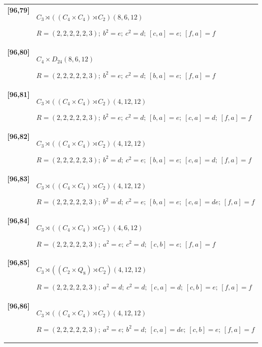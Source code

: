 \documentclass[UTF8,fontset=fandol,11pt,a4paper]{ctexart}
\begin{document}
\begin{longtable}{@{}p{17mm}>{\raggedright\arraybackslash}p{141mm}@{}}
\textbf{[96,79]} & $C_{3}\rtimes ((C_{4}\times C_{4})\rtimes C_{2})$\quad $(8,6,12)$\par\(R=(2,2,2,2,2,3);\allowbreak\ b^{2}=e;\allowbreak\ c^{2}=d;\allowbreak\ [c,a]=e;\allowbreak\ [f,a]=f\)\\[3pt]

\textbf{[96,80]} & $C_{4}\times D_{24}$\quad $(8,6,12)$\par\(R=(2,2,2,2,2,3);\allowbreak\ b^{2}=e;\allowbreak\ c^{2}=d;\allowbreak\ [b,a]=e;\allowbreak\ [f,a]=f\)\\[3pt]

\textbf{[96,81]} & $C_{3}\rtimes ((C_{4}\times C_{4})\rtimes C_{2})$\quad $(4,12,12)$\par\(R=(2,2,2,2,2,3);\allowbreak\ b^{2}=e;\allowbreak\ c^{2}=d;\allowbreak\ [b,a]=e;\allowbreak\ [c,a]=d;\allowbreak\ [f,a]=f\)\\[3pt]

\textbf{[96,82]} & $C_{3}\rtimes ((C_{4}\times C_{4})\rtimes C_{2})$\quad $(4,12,12)$\par\(R=(2,2,2,2,2,3);\allowbreak\ b^{2}=d;\allowbreak\ c^{2}=e;\allowbreak\ [b,a]=e;\allowbreak\ [c,a]=d;\allowbreak\ [f,a]=f\)\\[3pt]

\textbf{[96,83]} & $C_{3}\rtimes ((C_{4}\times C_{4})\rtimes C_{2})$\quad $(4,12,12)$\par\(R=(2,2,2,2,2,3);\allowbreak\ b^{2}=d;\allowbreak\ c^{2}=e;\allowbreak\ [b,a]=e;\allowbreak\ [c,a]=de;\allowbreak\ [f,a]=f\)\\[3pt]

\textbf{[96,84]} & $C_{3}\rtimes ((C_{4}\times C_{4})\rtimes C_{2})$\quad $(4,6,12)$\par\(R=(2,2,2,2,2,3);\allowbreak\ a^{2}=e;\allowbreak\ c^{2}=d;\allowbreak\ [c,b]=e;\allowbreak\ [f,a]=f\)\\[3pt]

\textbf{[96,85]} & $C_{3}\rtimes ((C_{2}\times Q_{8})\rtimes C_{2})$\quad $(4,12,12)$\par\(R=(2,2,2,2,2,3);\allowbreak\ a^{2}=d;\allowbreak\ c^{2}=d;\allowbreak\ [c,a]=d;\allowbreak\ [c,b]=e;\allowbreak\ [f,a]=f\)\\[3pt]

\textbf{[96,86]} & $C_{3}\rtimes ((C_{4}\times C_{4})\rtimes C_{2})$\quad $(4,12,12)$\par\(R=(2,2,2,2,2,3);\allowbreak\ a^{2}=e;\allowbreak\ b^{2}=d;\allowbreak\ [c,a]=de;\allowbreak\ [c,b]=e;\allowbreak\ [f,a]=f\)\\[3pt]


\end{longtable}
\end{document}
